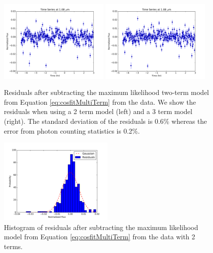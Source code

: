 \documentclass[manuscript]{aastex6}
\begin{document}
\begin{figure}
\begin{centering}
\includegraphics[width=0.48\textwidth]{residual_2term_1080nm.pdf}
\includegraphics[width=0.48\textwidth]{residual_3term_1080nm.pdf}
\caption{Residuals after subtracting the maximum likelihood two-term model from Equation \ref{eq:cosfitMultiTerm} from the data.  We show the residuals when using a 2 term model (left) and a 3 term model (right). The standard deviation of the residuals is 0.6\% whereas the error from photon counting statistics is 0.2\%.}\label{fig:resid2Cosfit}
\end{centering}
\end{figure}

\begin{figure}
\begin{centering}
\includegraphics[width=0.5\textwidth]{histo_resids.pdf}
\caption{Histogram of residuals after subtracting the maximum likelihood model from Equation \ref{eq:cosfitMultiTerm} from the data with 2 terms.}\label{fig:histoResid2Cosfit}
\end{centering}
\end{figure}
\end{document}
